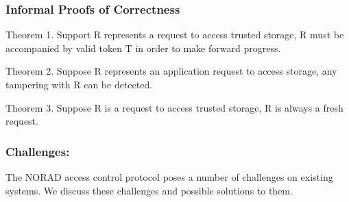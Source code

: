 \documentclass[withindex,glossary]{cam-thesis}
\begin{document}
\subsubsection{Informal Proofs of Correctness}

Theorem 1. Support R represents a request to access trusted storage, R must be accompanied by valid token T in order to make forward progress. 

Theorem 2. Suppose R represents an application request to access storage, any tampering with R can be detected.

Theorem 3. Suppose R is a request to access trusted storage, R is always a fresh request.



\subsubsection{Challenges:}
The NORAD access control protocol poses a number of challenges on existing systems.
We discuss these challenges and possible solutions to them.
\end{document}
